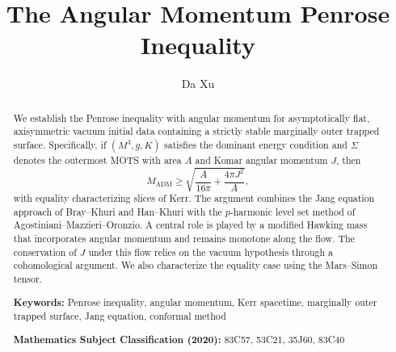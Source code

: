 \documentclass[11pt,a4paper]{article}
\theoremstyle{plain}
\theoremstyle{definition}
\theoremstyle{remark}
\newcommand{\ADM}{\mathrm{ADM}}
\begin{document}
\title{\textbf{The Angular Momentum Penrose Inequality}}

\author{Da Xu}

\date{}

\maketitle

\begin{abstract}
\noindent
We establish the Penrose inequality with angular momentum for asymptotically flat, axisymmetric vacuum initial data containing a strictly stable marginally outer trapped surface. Specifically, if $(M^3, g, K)$ satisfies the dominant energy condition and $\Sigma$ denotes the outermost MOTS with area $A$ and Komar angular momentum $J$, then
\[
M_{\ADM} \geq \sqrt{\frac{A}{16\pi} + \frac{4\pi J^2}{A}},
\]
with equality characterizing slices of Kerr. The argument combines the Jang equation approach of Bray--Khuri and Han--Khuri with the $p$-harmonic level set method of Agostiniani--Mazzieri--Oronzio. A central role is played by a modified Hawking mass that incorporates angular momentum and remains monotone along the flow. The conservation of $J$ under this flow relies on the vacuum hypothesis through a cohomological argument. We also characterize the equality case using the Mars--Simon tensor.

\medskip
\noindent
\textbf{Keywords:} Penrose inequality, angular momentum, Kerr spacetime, marginally outer trapped surface, Jang equation, conformal method

\medskip
\noindent
\textbf{Mathematics Subject Classification (2020):} 83C57, 53C21, 35J60, 83C40
\end{abstract}

\tableofcontents
\newpage



\end{document}
